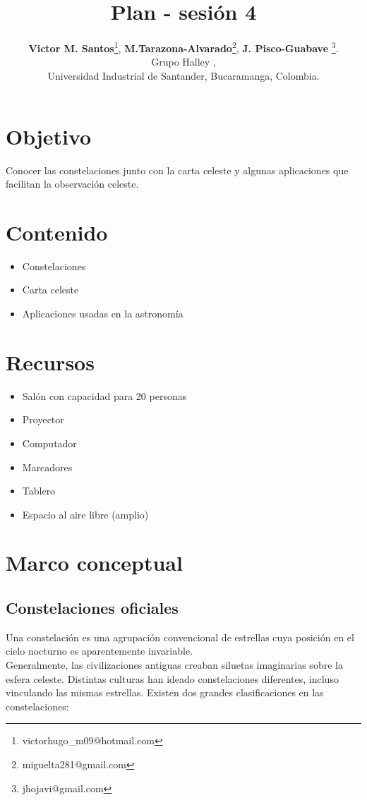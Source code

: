 \documentclass[10pt,a4paper]{article}
\title{Plan - sesión 4}
\author{\textbf{Victor M. Santos}\thanks{victorhugo\_m09@hotmail.com}, \textbf{M.Tarazona-Alvarado}\thanks{miguelta281@gmail.com}, \textbf{J. Pisco-Guabave} \thanks{jhojavi@gmail.com}. \\ Grupo Halley , \\ Universidad Industrial de Santander, Bucaramanga, Colombia.}
\date{ }
\begin{document}
\maketitle
\tableofcontents
\section{Objetivo}
Conocer las constelaciones junto con la carta celeste y algunas aplicaciones que facilitan la observación celeste.

\section{Contenido}
\begin{itemize}
\item Constelaciones
\item Carta celeste
\item Aplicaciones usadas en la astronomía
\end{itemize}


\section{Recursos}
\begin{itemize}
 \item Salón con capacidad para 20 personas
 \item Proyector
 \item Computador
 \item Marcadores
 \item Tablero
 \item Espacio al aire libre (amplio)
\end{itemize}

\section{Marco conceptual}

\subsection{Constelaciones oficiales}
Una constelación es una agrupación convencional de estrellas cuya posición en el cielo nocturno es aparentemente invariable.\\

Generalmente, las civilizaciones antiguas creaban siluetas  imaginarias sobre la esfera celeste. Distintas culturas han ideado constelaciones diferentes, incluso vinculando las mismas estrellas. Existen dos grandes clasificaciones en las constelaciones:
\end{document}
